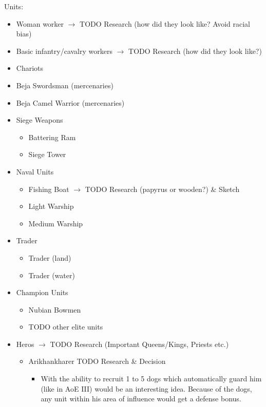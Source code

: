\documentclass[a4paper,12pt]{scrreprt}
\begin{document}
Units:

\begin{itemize}
	\item Woman worker $\rightarrow$ TODO Research (how did they look like? Avoid racial bias)
	\item Basic infantry/cavalry workers $\rightarrow$ TODO Research (how did they look like?)
	\item Chariots
	\item Beja Swordsman (mercenaries)
	\item Beja Camel Warrior (mercenaries)
	\item Siege Weapons
	\begin{itemize}
		\item Battering Ram
		\item Siege Tower
	\end{itemize}
	\item Naval Units
	\begin{itemize}
		\item Fishing Boat $\rightarrow$ TODO Research (papyrus or wooden?) \& Sketch
		\item Light Warship
		\item Medium Warship
	\end{itemize}
	\item Trader
	\begin{itemize}
		\item Trader (land)
		\item Trader (water)
	\end{itemize}
	\item Champion Units
	\begin{itemize}
		\item Nubian Bowmen
		\item TODO other elite units
	\end{itemize}
	\item Heros $\rightarrow$ TODO Research (Important Queens/Kings, Priests etc.)
	\begin{itemize}
		\item Arikhankharer TODO Research \& Decision
		\begin{itemize}
			\item With the ability to recruit 1 to 5 dogs which automatically guard him (like in AoE III) would be an interesting idea. Because of the dogs, any unit within his area of influence would get a defense bonus.  
		\end{itemize}
	\end{itemize}
\end{itemize}
\end{document}
